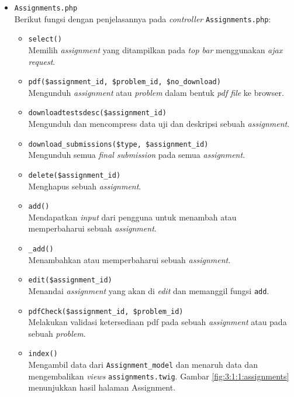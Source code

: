 \documentclass[a4paper,twoside]{article}
\begin{document}
\begin{enumerate}
\begin{itemize}
		            \begin{itemize}
			            \item \verb|Assignments.php| \\
			                  Berikut fungsi dengan penjelasannya pada \textit{controller} \verb|Assignments.php|:

			                  \begin{itemize}
				                  \item \verb|select()| \\
				                        Memilih \textit{assignment} yang ditampilkan pada \textit{top bar} menggunakan \textit{ajax request}.
				                  \item \verb|pdf($assignment_id, $problem_id, $no_download)| \\
				                        Mengunduh \textit{assignment} atau \textit{problem} dalam bentuk \textit{pdf file} ke browser.
				                  \item \verb|downloadtestsdesc($assignment_id)| \\
				                        Mengunduh dan mencompress data uji dan deskripsi sebuah \textit{assignment}.
				                  \item \verb|download_submissions($type, $assignment_id)| \\
				                        Mengunduh semua \textit{final submission} pada semua \textit{assignment}.
				                  \item \verb|delete($assignment_id)| \\
				                        Menghapus sebuah \textit{assignment}.
				                  \item \verb|add()| \\
				                        Mendapatkan \textit{input} dari pengguna untuk menambah atau memperbaharui sebuah \textit{assignment}.
				                  \item \verb|_add()| \\
				                        Menambahkan atau memperbaharui sebuah \textit{assignment}.
				                  \item \verb|edit($assignment_id)| \\
				                        Menandai \textit{assignment} yang akan di \textit{edit} dan memanggil fungsi \verb|add|.
				                  \item \verb|pdfCheck($assignment_id, $problem_id)| \\
				                        Melakukan validasi ketersediaan pdf pada sebuah \textit{assignment} atau pada sebuah \textit{problem}.
				                  \item \verb|index()| \\
				                        Mengambil data dari \verb|Assignment_model| dan menaruh data dan mengembalikan \textit{views} \verb|assignments.twig|. Gambar \ref{fig:3:1:1:assignments} menunjukkan hasil halaman Assignment.


\end{itemize}
\end{itemize}
\end{itemize}
\end{enumerate}
\end{document}

